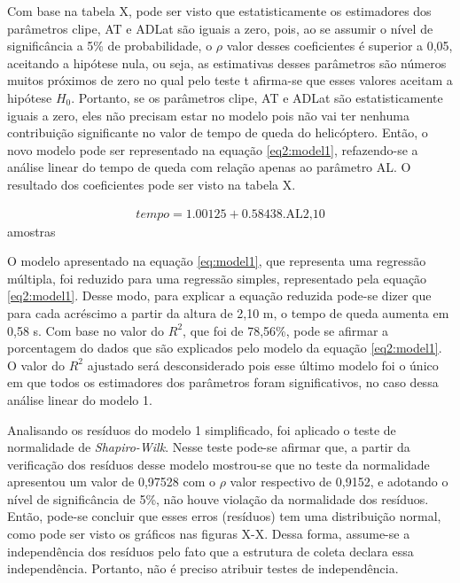 Com base na tabela X, pode ser visto que estatisticamente os estimadores dos parâmetros clipe, AT e ADLat são iguais a zero, pois, ao se assumir o nível de significância a 5\% de probabilidade, o $\rho$ valor desses coeficientes é superior a 0,05, aceitando a hipótese nula, ou seja, as estimativas desses parâmetros são números muitos próximos de zero no qual pelo teste t afirma-se que esses valores aceitam a hipótese $H_0$. Portanto, se os parâmetros clipe, AT e ADLat são estatisticamente iguais a zero, eles não precisam estar no modelo pois não vai ter nenhuma contribuição significante no valor de tempo de queda do helicóptero. Então, o novo modelo pode ser representado na equação \ref{eq2:model1}, refazendo-se a análise linear do tempo de queda com relação apenas ao parâmetro AL. O resultado dos coeficientes pode ser visto na tabela X.  


\begin{align}
    tempo = 1.00125 + 0.58438\text{.AL2,10}
    \label{eq2:model1}
\end{align}amostras

O modelo apresentado na equação \ref{eq:model1}, que representa uma regressão múltipla, foi reduzido para uma regressão simples, representado pela equação \ref{eq2:model1}. Desse modo, para explicar a equação reduzida pode-se dizer que para cada acréscimo a partir da altura de 2,10 m, o tempo de queda aumenta em 0,58 s. Com base no valor do $R^2$, que foi de 78,56\%, pode se afirmar a porcentagem do dados que são explicados pelo modelo da equação \ref{eq2:model1}. O valor do $R^2$ ajustado será desconsiderado pois esse último modelo foi o único em que todos os estimadores dos parâmetros foram significativos, no caso dessa análise linear do modelo 1. 

Analisando os resíduos do modelo 1 simplificado, foi aplicado o teste de normalidade de \textit{Shapiro-Wilk}. Nesse teste pode-se afirmar que, a partir da verificação dos resíduos desse modelo mostrou-se que no teste da normalidade apresentou um valor de 0,97528 com o $\rho$ valor respectivo de 0,9152, e adotando o nível de significância de 5\%, não houve violação da normalidade dos resíduos. Então, pode-se concluir que esses erros (resíduos) tem uma distribuição normal, como pode ser visto os gráficos nas figuras X-X. Dessa forma, assume-se a independência dos resíduos pelo fato que a estrutura de coleta declara essa independência. Portanto, não é preciso atribuir testes de independência.

